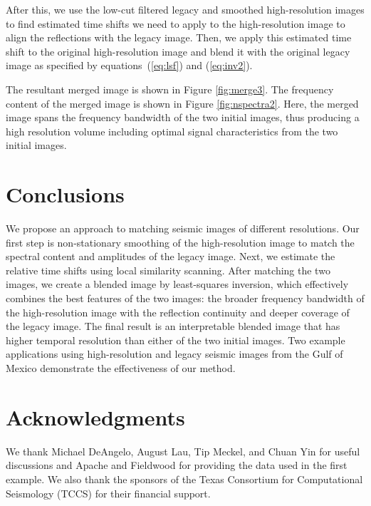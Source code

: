     After this, we use the low-cut filtered legacy and smoothed high-resolution images to find estimated time shifts we need to apply to the high-resolution image to align the reflections with the legacy image. 
    Then, we apply this estimated time shift to the original high-resolution image and blend it with the original legacy image as specified by equations~(\ref{eq:lsf}) and (\ref{eq:inv2}).
    
    The resultant merged image is shown in Figure \ref{fig:merge3}. 
    The frequency content of the merged image is shown in Figure \ref{fig:nspectra2}. 
    Here, the merged image spans the frequency bandwidth of the two initial images, thus producing a high resolution volume including optimal signal characteristics from the two initial images.
    
    

\section{Conclusions}
    
    We propose an approach to matching seismic images of different resolutions. 
    Our first step is non-stationary smoothing of the high-resolution image to match the spectral content and amplitudes of the legacy image. 
    Next, we estimate the relative time shifts using local similarity scanning. After matching the two images, we create a blended image by least-squares inversion, which effectively combines the best features of the two images: the broader frequency bandwidth of the high-resolution image with the reflection continuity and deeper coverage of the legacy image. 
    The final result is an interpretable blended image that has higher temporal resolution than either of the two initial images. 
    Two example applications using high-resolution and legacy seismic images from the Gulf of Mexico demonstrate the effectiveness of our method.
    
\section{Acknowledgments}

    We thank Michael DeAngelo, August Lau, Tip Meckel, and Chuan Yin for useful discussions and Apache and Fieldwood for providing the data used in the first example. 
    We also thank the sponsors of the Texas Consortium for Computational Seismology (TCCS) for their financial support. 
